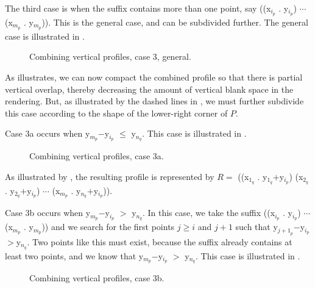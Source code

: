 The third case is when the suffix contains more than one point, say
((x$_{i_p}$ . y$_{i_p}$) $\cdots$ (x$_{m_p}$ . y$_{m_p}$)).  This is
the general case, and can be subdivided further.  The general case is
illustrated in .

\begin{figure}
\begin{center}
\end{center}
\caption{\label{fig-profile-vertical-case-3}
Combining vertical profiles, case 3, general.}
\end{figure}

As  illustrates, we can now
compact the combined profile so that there is partial vertical
overlap, thereby decreasing the amount of vertical blank space in the
rendering.  But, as illustrated by the dashed lines in
, we must further subdivide this
case according to the shape of the lower-right corner of $P$.

Case 3a occurs when y$_{m_p}$$-$y$_{i_p}$ $\le$ y$_{n_q}$.  This case is
illustrated in .

\begin{figure}
\begin{center}
\end{center}
\caption{\label{fig-profile-vertical-case-3a}
Combining vertical profiles, case 3a.}
\end{figure}

As illustrated by , the resulting
profile is represented by $R = $ ((x$_{1_q}$ . y$_{1_q}$$+$y$_{i_p}$)
(x$_{2_q}$ . y$_{2_q}$$+$y$_{i_p}$) $\cdots$ (x$_{m_p}$
. y$_{n_q}$$+$y$_{i_p}$)).

Case 3b occurs when y$_{m_p}$$-$y$_{i_p}$ $>$ y$_{n_q}$.  In this
case, we take the suffix ((x$_{i_p}$ . y$_{i_p}$) $\cdots$ (x$_{m_p}$
. y$_{m_p}$)) and we search for the first points $j\ge i$ and $j+1$ such
that y$_{{j+1}_p}$$-$y$_{i_p}$$>$y$_{n_q}$.  Two points like this must exist,
because the suffix already contains at least two points, and we know
that y$_{m_p}$$-$y$_{i_p}$ $>$ y$_{n_q}$.  This case is illustrated in
.

\begin{figure}
\begin{center}
\end{center}
\caption{\label{fig-profile-vertical-case-3b}
Combining vertical profiles, case 3b.}
\end{figure}

